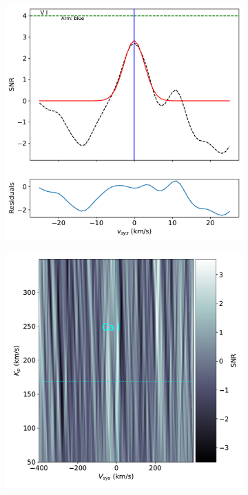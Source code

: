 \documentclass[twocolumn]{aastex631}
\begin{document}
\begin{figure}[ht!]
\begin{subfigure}[b]{0.333\textwidth}
            \end{subfigure}
            \begin{subfigure}[b]{0.333\textwidth}\label{fig:1d-ccf-V-combined}
                \includegraphics[width=\textwidth]{plots-updated/line-profile/blue/KELT-20b.20190504.blue.V.SNR-Gaussian.pdf}
                
            \end{subfigure}
    
            \begin{subfigure}[b]{0.333\textwidth}\label{fig:2d-ccf-Ca-combined}
                \includegraphics[width=\textwidth]{plots-updated/kp-vsys-map/blue/KELT-20b.20190504.blue.Ca.CCFs-shifted.pdf}
                

\end{subfigure}
\end{figure}
\end{document}
